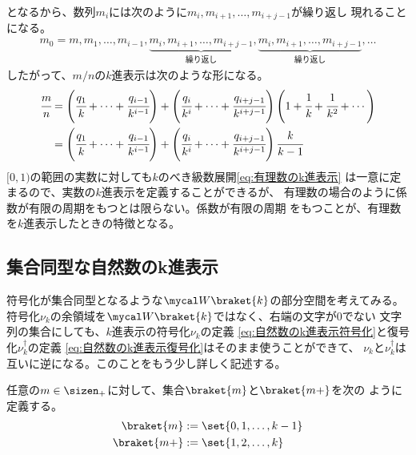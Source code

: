 	となるから、数列$m_i$には次のように$m_i,m_{i+1},\dots,m_{i+j-1}$が繰り返し
	現れることになる。
	\begin{equation*}\begin{split}
		m_0=m,m_1,\dots,m_{i-1}
		,\underbrace{m_i,m_{i+1},\dots,m_{i+j-1}}_{\text{繰り返し}}
		,\underbrace{m_i,m_{i+1},\dots,m_{i+j-1}}_{\text{繰り返し}}
		,\dots
	\end{split}\end{equation*}
	したがって、$m/n$の$k$進表示は次のような形になる。
	\begin{equation*}\begin{split}
		\cfrac{m}{n} 
		&= \left(\cfrac{q_1}{k} + \cdots + \cfrac{q_{i-1}}{k^{i-1}}\right)
		+ \left(\cfrac{q_i}{k^i} + \cdots + \cfrac{q_{i+j-1}}{k^{i+j-1}}\right)
			\left(1 + \cfrac{1}{k} + \cfrac{1}{k^2} + \cdots\right) \\
		&= \left(\cfrac{q_1}{k} + \cdots + \cfrac{q_{i-1}}{k^{i-1}}\right)
		+ \left(\cfrac{q_i}{k^i} + \cdots + \cfrac{q_{i+j-1}}{k^{i+j-1}}\right)
			\cfrac{k}{k-1} \\
	\end{split}\end{equation*}
	$[0,1)$の範囲の実数に対しても$k$のべき級数展開\eqref{eq:有理数のk進表示}
	は一意に定まるので、実数の$k$進表示を定義することができるが、
	有理数の場合のように係数が有限の周期をもつとは限らない。係数が有限の周期
	をもつことが、有理数を$k$進表示したときの特徴となる。
\subsection{集合同型な自然数のk進表示}\label{s2:集合同型な自然数のk進表示} %
	符号化が集合同型となるような$\Word\braket{k}$の部分空間を考えてみる。
	符号化$\nu_k$の余領域を$\Word\braket{k}$ではなく、右端の文字が$0$でない
	文字列の集合にしても、$k$進表示の符号化$\nu_k$の定義
	\eqref{eq:自然数のk進表示符号化}と復号化$\nu_k^\dag$の定義
	\eqref{eq:自然数のk進表示復号化}はそのまま使うことができて、
	$\nu_k$と$\nu_k^\dag$は互いに逆になる。このことをもう少し詳しく記述する。

	\begin{definition}[文字としての数]\label{def:文字としての数} %
		任意の$m\in\sizen_+$に対して、集合$\braket{m}$と$\braket{m+}$を次の
		ように定義する。
		\begin{equation*}\begin{split}
			\braket{m} &:= \set{0,1,\dots,k-1} \\
			\braket{m+} &:= \set{1,2,\dots,k} \\
		\end{split}\end{equation*}
	\end{definition} %

